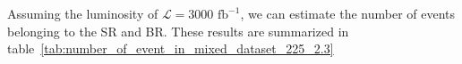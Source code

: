 \documentclass[12pt]{article}
\begin{document}
    Assuming the luminosity of $\mathcal{L} = \text{3000 fb}^{-1}$, we can estimate the number of events belonging to the SR and BR. These results are summarized in table~\ref{tab:number_of_event_in_mixed_dataset_225_2.3}
    \begin{table}[htpb]
        \centering
        \caption{The number of events of mixed datasets under different selection cuts.}
        \label{tab:number_of_event_in_mixed_dataset_225_2.3}
         \\
    \end{table}
\end{document}
